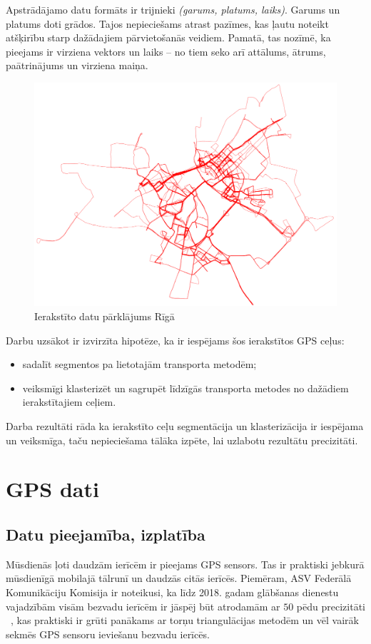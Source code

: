 \documentclass{ludis}
\begin{document}
Apstrādājamo datu formāts ir trijnieki \emph{(garums, platums, laiks)}. Garums un platums doti 
grādos. Tajos nepieciešams atrast pazīmes, kas ļautu noteikt atšķirību starp dažādajiem 
pārvietošanās veidiem. Pamatā, tas nozīmē, ka pieejams ir virziena vektors un laiks -- no tiem
seko arī attālums, ātrums, paātrinājums un virziena maiņa.

\begin{figure}
  \centering
  \includegraphics[scale=0.5]{img/all_trails}
  \caption{Ierakstīto datu pārklājums Rīgā}
  \label{fig:all_trails}
\end{figure}

Darbu uzsākot ir izvirzīta hipotēze, ka ir iespējams šos ierakstītos GPS ceļus:
\begin{itemize}
\item sadalīt segmentos pa lietotajām transporta metodēm;
\item veiksmīgi klasterizēt un sagrupēt līdzīgās transporta metodes no dažādiem ierakstītajiem ceļiem.
\end{itemize}


Darba rezultāti rāda ka ierakstīto ceļu segmentācija un klasterizācija ir iespējama un veiksmīga,
taču nepieciešama tālāka izpēte, lai uzlabotu rezultātu precizitāti.

\chapter{GPS dati}
\section{Datu pieejamība, izplatība}
Mūsdienās ļoti daudzām ierīcēm ir pieejams GPS sensors. Tas ir praktiski jebkurā mūsdienīgā mobilajā
tālrunī un daudzās citās ierīcēs. Piemēram, ASV Federālā Komunikāciju Komisija ir noteikusi, ka līdz
2018. gadam glābšanas dienestu vajadzībām visām bezvadu ierīcēm ir jāspēj būt atrodamām 
ar $50$ pēdu precizitāti ~\cite{fcc_e911}, kas praktiski ir grūti panākams ar torņu triangulācijas 
metodēm un vēl vairāk sekmēs GPS sensoru ieviešanu bezvadu ierīcēs.
\end{document}

